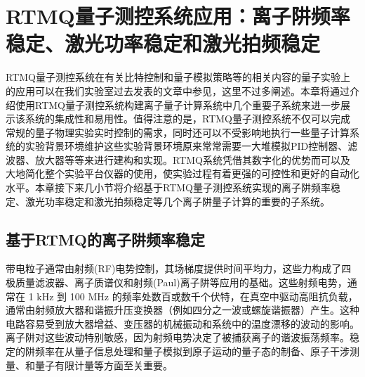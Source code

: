 

\chapter[RTMQ测控系统应用：离子阱频率稳定、激光功率稳定和激光拍频稳定]{RTMQ量子测控系统应用：离子阱频率稳定、激光功率稳定和激光拍频稳定\label{section:implementation}}

RTMQ量子测控系统在有关比特控制和量子模拟策略等的相关内容的量子实验上的应用可以在我们实验室过去发表的文章\cite[]{Zhang_Wang_Wang_Zhang_Wu_Jie_Lu_2022}中参见，这里不过多阐述。本章将通过介绍使用RTMQ量子测控系统构建离子量子计算系统中几个重要子系统来进一步展示该系统的集成性和易用性。值得注意的是，RTMQ量子测控系统不仅可以完成常规的量子物理实验实时控制的需求，同时还可以不受影响地执行一些量子计算系统的实验背景环境维护这些实验背景环境原来常常需要一大堆模拟PID控制器、滤波器、放大器等等来进行建构和实现。RTMQ系统凭借其数字化的优势而可以及大地简化整个实验平台仪器的使用，使实验过程有着更强的可控性和更好的自动化水平。本章接下来几小节将介绍基于RTMQ量子测控系统实现的离子阱频率稳定、激光功率稳定和激光拍频稳定等几个离子阱量子计算的重要的子系统。




\section[基于RTMQ的离子阱频率稳定]{基于RTMQ的离子阱频率稳定\label{section:trap_frequency_stablization}}

带电粒子通常由射频(RF)电势控制，其场梯度提供时间平均力，这些力构成了四极质量滤波器、离子质谱仪和射频(Paul)离子阱等应用的基础\cite[]{Dehmelt_1990, Paul_1990}。这些射频电势，通常在 1 kHz 到 100 MHz 的频率处数百或数千个伏特，在真空中驱动高阻抗负载，通常由射频放大器和谐振升压变换器（例如四分之一波或螺旋谐振器）产生\cite[]{Siverns_Simkins_Weidt_Hensinger_2012}。这种电路容易受到放大器增益、变压器的机械振动和系统中的温度漂移的波动的影响。离子阱对这些波动特别敏感，因为射频电势决定了被捕获离子的谐波振荡频率。稳定的阱频率在从量子信息处理\cite[]{Blatt_Wineland_2008, Monroe_Kim_2013}和量子模拟\cite[]{Richerme_Gong_Lee_Senko_Smith_Foss_Feig_Michalakis_Gorshkov_Monroe_2014, Jurcevic_Lanyon_Hauke_Hempel_Zoller_Blatt_Roos_2014}到原子运动的量子态的制备\cite[]{Leibfried_Blatt_Monroe_Wineland_2003}、原子干涉测量\cite[]{Johnson_Neyenhuis_Mizrahi_Wong_Campos_Monroe_2015}、和量子有限计量\cite[]{Chou_Hume_Koelemeij_Wineland_Rosenband_2010}等方面至关重要。


